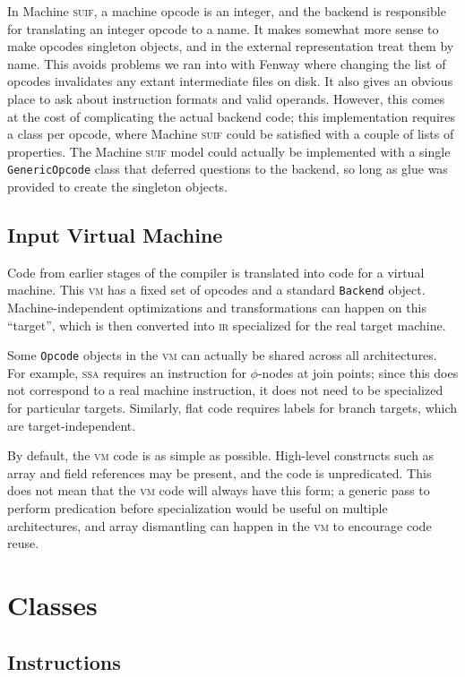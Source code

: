 \documentclass[11pt]{article}
\def\class#1{\texttt{#1}}
\def\ir{\textsc{ir}}
\def\ssa{\textsc{ssa}}
\def\suif{\textsc{suif}}
\def\vm{\textsc{vm}}
\def\machsuif{Machine \suif}
\begin{document}
In \machsuif{}, a machine opcode is an integer, and the backend is
responsible for translating an integer opcode to a name.  It makes
somewhat more sense to make opcodes singleton objects, and in the
external representation treat them by name.  This avoids problems we
ran into with Fenway\cite{fenway} where changing the list of opcodes
invalidates any extant intermediate files on disk.  It also gives an
obvious place to ask about instruction formats and valid operands.
However, this comes at the cost of complicating the actual backend
code; this implementation requires a class per opcode, where
\machsuif{} could be satisfied with a couple of lists of properties.
The \machsuif{} model could actually be implemented with a single
\class{Generic\-Opcode} class that deferred questions to the backend,
so long as glue was provided to create the singleton objects.

\subsection{Input Virtual Machine}

Code from earlier stages of the compiler is translated into code for a
virtual machine.  This \vm{} has a fixed set of opcodes and a standard
\class{Backend} object.  Machine-independent optimizations and
transformations can happen on this ``target'', which is then converted
into \ir{} specialized for the real target machine.

Some \class{Opcode} objects in the \vm{} can actually be shared across
all architectures.  For example, \ssa{} requires an instruction for
$\phi$-nodes at join points; since this does not correspond to a real
machine instruction, it does not need to be specialized for particular
targets.  Similarly, flat code requires labels for branch targets,
which are target-independent.

By default, the \vm{} code is as simple as possible.  High-level
constructs such as array and field references may be present, and the
code is unpredicated.  This does not mean that the \vm{} code will
always have this form; a generic pass to perform predication before
specialization would be useful on multiple architectures, and
array dismantling can happen in the \vm{} to encourage code reuse.

\section{Classes}

\subsection{Instructions}
\end{document}
